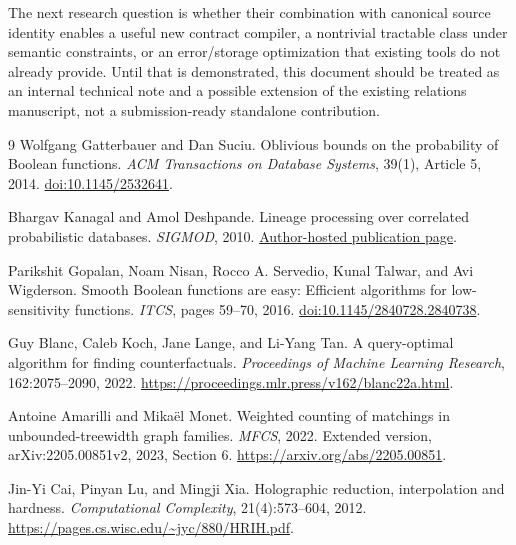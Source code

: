 \documentclass[11pt]{article}
\begin{document}
The next research question is whether their combination with canonical
source identity enables a useful new contract compiler, a nontrivial tractable
class under semantic constraints, or an error/storage optimization that existing
tools do not already provide. Until that is demonstrated, this document should
be treated as an internal technical note and a possible extension of the
existing relations manuscript, not a submission-ready standalone contribution.

\begin{thebibliography}{9}
Wolfgang Gatterbauer and Dan Suciu.
Oblivious bounds on the probability of Boolean functions.
\emph{ACM Transactions on Database Systems}, 39(1), Article 5, 2014.
\href{https://doi.org/10.1145/2532641}{doi:10.1145/2532641}.

Bhargav Kanagal and Amol Deshpande.
Lineage processing over correlated probabilistic databases.
\emph{SIGMOD}, 2010.
\href{https://research.google/pubs/lineage-processing-on-correlated-probabilistic-databases/}{Author-hosted publication page}.

Parikshit Gopalan, Noam Nisan, Rocco A. Servedio, Kunal Talwar, and Avi Wigderson.
Smooth Boolean functions are easy: Efficient algorithms for low-sensitivity
functions. \emph{ITCS}, pages 59--70, 2016.
\href{https://doi.org/10.1145/2840728.2840738}{doi:10.1145/2840728.2840738}.

Guy Blanc, Caleb Koch, Jane Lange, and Li-Yang Tan.
A query-optimal algorithm for finding counterfactuals.
\emph{Proceedings of Machine Learning Research}, 162:2075--2090, 2022.
\url{https://proceedings.mlr.press/v162/blanc22a.html}.

Antoine Amarilli and Mika\"el Monet.
Weighted counting of matchings in unbounded-treewidth graph families.
\emph{MFCS}, 2022. Extended version, arXiv:2205.00851v2, 2023, Section 6.
\url{https://arxiv.org/abs/2205.00851}.

Jin-Yi Cai, Pinyan Lu, and Mingji Xia.
Holographic reduction, interpolation and hardness.
\emph{Computational Complexity}, 21(4):573--604, 2012.
\url{https://pages.cs.wisc.edu/~jyc/880/HRIH.pdf}.
\end{thebibliography}
\end{document}

